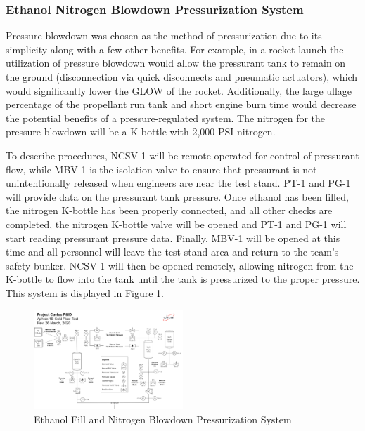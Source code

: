 \documentclass[9pt]{article} %
\numberwithin{equation}{section} %
\begin{document}
\subsubsection{Ethanol Nitrogen Blowdown Pressurization System}
\hspace{\parindent} Pressure blowdown was chosen as the method of pressurization due to its simplicity along with a few other benefits. For example, in a rocket launch the utilization of pressure blowdown would allow the pressurant tank to remain on the ground (disconnection via quick disconnects and pneumatic actuators), which would significantly lower the GLOW of the rocket. Additionally, the large ullage percentage of the propellant run tank and short engine burn time would decrease the potential benefits of a pressure-regulated system. The nitrogen for the pressure blowdown will be a K-bottle with 2,000 PSI nitrogen.

To describe procedures, NCSV-1 will be remote-operated for control of pressurant flow, while MBV-1 is the isolation valve to ensure that pressurant is not unintentionally released when engineers are near the test stand. PT-1 and PG-1 will provide data on the pressurant tank pressure. Once ethanol has been filled, the nitrogen K-bottle has been properly connected, and all other checks are completed, the nitrogen K-bottle valve will be opened and PT-1 and PG-1 will start reading pressurant pressure data. Finally, MBV-1 will be opened at this time and all personnel will leave the test stand area and return to the team's safety bunker. NCSV-1 will then be opened remotely, allowing nitrogen from the K-bottle to flow into the tank until the tank is pressurized to the proper pressure. This system is displayed in Figure \ref{fig:ethanol_fill_and_pressurization_system}.

\begin{figure}[!htb] 
    \centering
    \includegraphics[scale=0.5, width=0.5\textwidth, trim={0cm 19cm 34.05cm 5cm}, clip]{pid} %
    \caption{Ethanol Fill and Nitrogen Blowdown Pressurization System}
    \label{fig:ethanol_fill_and_pressurization_system}
\end{figure}
\end{document}
